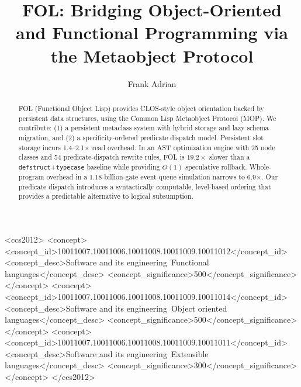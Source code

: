 \documentclass[sigconf,nonacm]{acmart}
\begin{document}

\title{FOL: Bridging Object-Oriented and Functional Programming via the Metaobject Protocol}

\author{Frank Adrian}

\begin{abstract}
FOL (Functional Object Lisp) provides CLOS-style object orientation backed by persistent data structures, using the Common Lisp Metaobject Protocol (MOP). We contribute: (1) a persistent metaclass system with hybrid storage and lazy schema migration, and (2) a specificity-ordered predicate dispatch model. Persistent slot storage incurs 1.4--2.1$\times$ read overhead. In an AST optimization engine with 25 node classes and 54 predicate-dispatch rewrite rules, FOL is $19.2{\times}$ slower than a \texttt{defstruct}+\texttt{typecase} baseline while providing $O(1)$ speculative rollback. Whole-program overhead in a 1.18-billion-gate event-queue simulation narrows to 6.9$\times$. Our predicate dispatch introduces a syntactically computable, level-based ordering that provides a predictable alternative to logical subsumption.
\end{abstract}

\begin{CCSXML}
<ccs2012>
   <concept>
       <concept_id>10011007.10011006.10011008.10011009.10011012</concept_id>
       <concept_desc>Software and its engineering~Functional languages</concept_desc>
       <concept_significance>500</concept_significance>
   </concept>
   <concept>
       <concept_id>10011007.10011006.10011008.10011009.10011014</concept_id>
       <concept_desc>Software and its engineering~Object oriented languages</concept_desc>
       <concept_significance>500</concept_significance>
   </concept>
   <concept>
       <concept_id>10011007.10011006.10011008.10011009.10011011</concept_id>
       <concept_desc>Software and its engineering~Extensible languages</concept_desc>
       <concept_significance>300</concept_significance>
   </concept>
</ccs2012>
\end{CCSXML}


\end{document}
